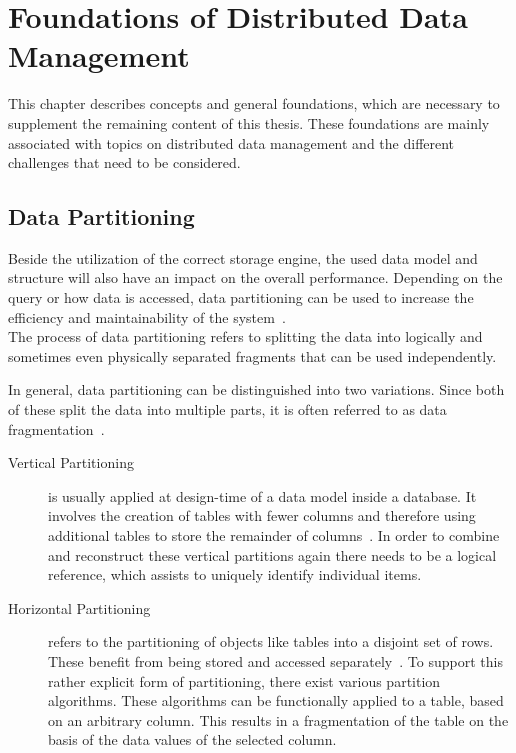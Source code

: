 \chapter{Foundations of Distributed Data Management}
\label{c:Foundation}

This chapter describes concepts and general foundations, which are necessary to supplement 
the remaining content of this thesis. These foundations are mainly associated with topics on distributed data management
and the different challenges that need to be considered.




\section{Data Partitioning}
\label{sec:part}

Beside the utilization of the correct storage engine, the used data model and structure 
will also have an impact on the overall performance. Depending on the query or 
how data is accessed, data partitioning can be used to increase the efficiency and 
maintainability of the system~\cite{Agrawal_2004}.\\
The process of data partitioning refers to splitting the data into logically and sometimes even
physically separated fragments that can be used independently.

In general, data partitioning can be distinguished into two variations.
Since both of these split the data into multiple parts, it is often referred to as data fragmentation~\cite{tamer:2005}. 

\begin{description}
    \item [Vertical Partitioning] is usually applied at design-time of a data model inside a 
    database. It involves the creation of tables with fewer columns and therefore using additional 
    tables to store the remainder of columns~\cite{vertical_1984, normalization_2012}.
    In order to combine and reconstruct these vertical partitions again there needs to be a logical reference,
    which assists to uniquely identify individual items. 
    \item [Horizontal Partitioning] refers to the partitioning of objects like tables 
    into a disjoint set of rows. These benefit from being stored and accessed separately~\cite{horizontal_1982}.
    To support this rather explicit form of partitioning, there exist various partition algorithms.
    These algorithms can be functionally applied to a table, based on an arbitrary column. 
    This results in a fragmentation of the table on the basis of the data values of the selected column.
\end{description}

